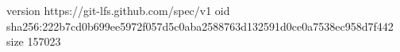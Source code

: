 version https://git-lfs.github.com/spec/v1
oid sha256:222b7cd0b699ee5972f057d5c0aba2588763d132591d0ce0a7538ec958d7f442
size 157023
